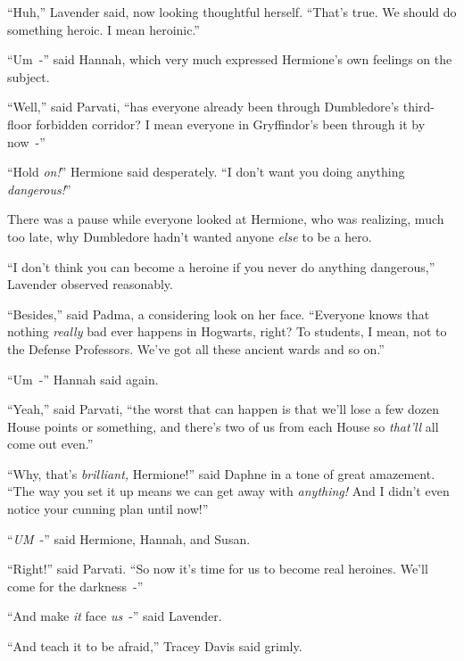 ``Huh,'' Lavender said, now looking thoughtful herself. ``That's true. We should do something heroic. I mean heroinic.''

``Um~-'' said Hannah, which very much expressed Hermione's own feelings on the subject.

``Well,'' said Parvati, ``has everyone already been through Dumbledore's third-floor forbidden corridor? I mean everyone in Gryffindor's been through it by now~-''

``Hold \emph{on!}'' Hermione said desperately. ``I don't want you doing anything \emph{dangerous!}''

There was a pause while everyone looked at Hermione, who was realizing, much too late, why Dumbledore hadn't wanted anyone \emph{else} to be a hero.

``I don't think you can become a heroine if you never do anything dangerous,'' Lavender observed reasonably.

``Besides,'' said Padma, a considering look on her face. ``Everyone knows that nothing \emph{really} bad ever happens in Hogwarts, right? To students, I mean, not to the Defense Professors. We've got all these ancient wards and so on.''

``Um~-'' Hannah said again.

``Yeah,'' said Parvati, ``the worst that can happen is that we'll lose a few dozen House points or something, and there's two of us from each House so \emph{that'll} all come out even.''

``Why, that's \emph{brilliant,} Hermione!'' said Daphne in a tone of great amazement. ``The way you set it up means we can get away with \emph{anything!} And I didn't even notice your cunning plan until now!''

``\emph{UM}~-'' said Hermione, Hannah, and Susan.

``Right!'' said Parvati. ``So now it's time for us to become real heroines. We'll come for the darkness~-''

``And make \emph{it} face \emph{us}~-'' said Lavender.

``And teach it to be afraid,'' Tracey Davis said grimly.
